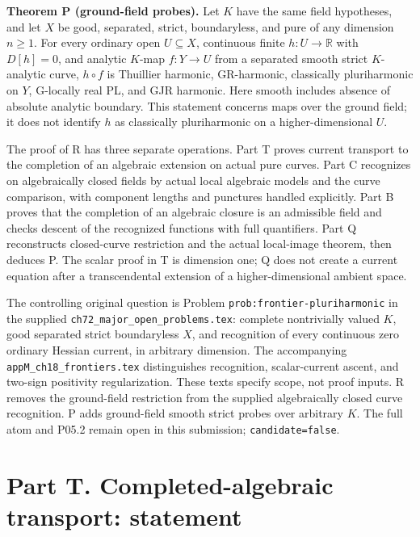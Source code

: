 \documentclass[
  10pt,
]{article}
\begin{document}
\textbf{Theorem P (ground-field probes).} Let \(K\) have the same field
hypotheses, and let \(X\) be good, separated, strict, boundaryless, and
pure of any dimension \(n\geq1\). For every ordinary open
\(U\subseteq X\), continuous finite \(h:U\to\mathbb R\) with \(D[h]=0\),
and analytic \(K\)-map \(f:Y\to U\) from a separated smooth strict
\(K\)-analytic curve, \(h\circ f\) is Thuillier harmonic, GR-harmonic,
classically pluriharmonic on \(Y\), G-locally real PL, and GJR harmonic.
Here smooth includes absence of absolute analytic boundary. This
statement concerns maps over the ground field; it does not identify
\(h\) as classically pluriharmonic on a higher-dimensional \(U\).

The proof of R has three separate operations. Part T proves current
transport to the completion of an algebraic extension on actual pure
curves. Part C recognizes on algebraically closed fields by actual local
algebraic models and the curve comparison, with component lengths and
punctures handled explicitly. Part B proves that the completion of an
algebraic closure is an admissible field and checks descent of the
recognized functions with full quantifiers. Part Q reconstructs
closed-curve restriction and the actual local-image theorem, then
deduces P. The scalar proof in T is dimension one; Q does not create a
current equation after a transcendental extension of a
higher-dimensional ambient space.

The controlling original question is Problem
\texttt{prob:frontier-pluriharmonic} in the supplied
\texttt{ch72\_major\_open\_problems.tex}: complete nontrivially valued
\(K\), good separated strict boundaryless \(X\), and recognition of
every continuous zero ordinary Hessian current, in arbitrary dimension.
The accompanying \texttt{appM\_ch18\_frontiers.tex} distinguishes
recognition, scalar-current ascent, and two-sign positivity
regularization. These texts specify scope, not proof inputs. R removes
the ground-field restriction from the supplied algebraically closed
curve recognition. P adds ground-field smooth strict probes over
arbitrary \(K\). The full atom and P05.2 remain open in this submission;
\texttt{candidate=false}.

\section{Part T. Completed-algebraic transport:
statement}\label{part-t.-completed-algebraic-transport-statement}
\end{document}
